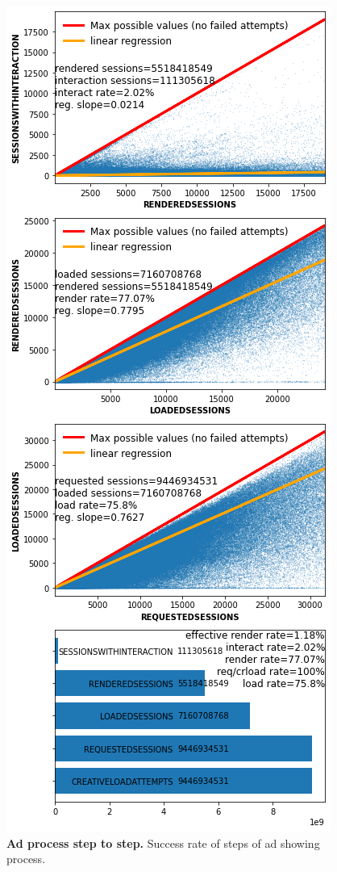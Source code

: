 \documentclass[fleqn,moreauthors,10pt]{ds_report}
\begin{document}
\begin{figure}\centering
	\includegraphics[width=\linewidth]{RelationRegression.png}
	\caption{\textbf{Ad process step to step.} Success rate of steps of ad showing process.}
	\label{fig:column}
\end{figure}
\end{document}
